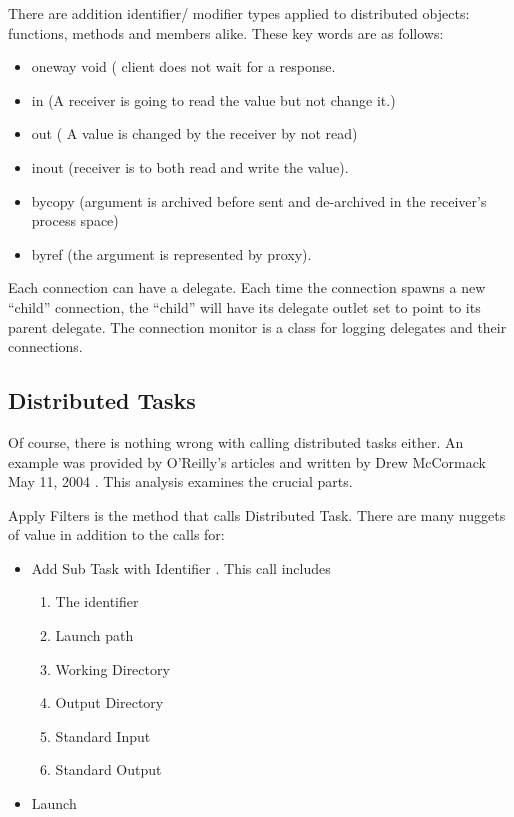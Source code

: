 \documentclass[11pt]{article}
\begin{document}
There are addition identifier/ modifier types applied to distributed objects: functions, methods and members alike.  These key words are as follows:
\begin{itemize}
\item oneway void ( client does not wait for a response.
\item in (A receiver is going to read the value but not change it.)
\item out ( A value is changed by the receiver by not read)
\item inout (receiver is to both read and write  the value).
\item bycopy (argument is archived before sent and de-archived in the receiver's process space)
\item byref (the argument is represented by proxy).   
\end{itemize}


Each connection can have a delegate.  Each time the connection spawns a new ``child'' connection, the ``child'' will have its delegate outlet set to point to its parent delegate. The connection monitor is a class for logging delegates and their connections.  

\subsection {Distributed Tasks}
Of course, there is nothing wrong with calling distributed tasks either.  An example was provided by O'Reilly's articles and written by Drew McCormack May 11, 2004 \cite {mccormack}. This analysis examines the crucial parts.

Apply Filters is the method that calls Distributed Task.  There are many nuggets of value in addition to the calls for:
\begin{itemize}
\item Add Sub Task with Identifier .  This call includes
\begin{enumerate}
\item The identifier
\item Launch path
\item Working Directory
\item Output Directory
\item Standard Input 
\item Standard Output
\end{enumerate}

\item Launch
\end{itemize}
\end{document}
